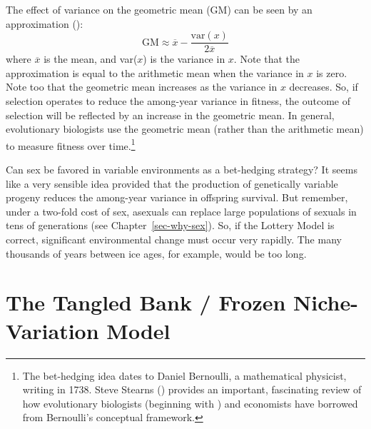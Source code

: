 \documentclass[
  american,
  letterpaper,
]{book}
\begin{document}
The effect of variance on the geometric mean (GM) can be seen by an
approximation ():\[\text{GM} \approx \overline{x} - \frac{\text{var}(x)}{2\overline{x}}\]
where \(\overline{x}\) is the mean, and var(\(x\)) is the variance in
\(x\). Note that the approximation is equal to the arithmetic mean when
the variance in \(x\) is zero. Note too that the geometric mean
increases as the variance in \(x\) decreases. So, if selection operates
to reduce the among-year variance in fitness, the outcome of selection
will be reflected by an increase in the geometric mean. In general,
evolutionary biologists use the geometric mean (rather than the
arithmetic mean) to measure fitness over time.\footnote{The bet-hedging
  idea dates to Daniel Bernoulli, a mathematical physicist, writing in
  1738. Steve Stearns () provides an
  important, fascinating review of how evolutionary biologists
  (beginning with ) and economists
  have borrowed from Bernoulli's conceptual framework.}

Can sex be favored in variable environments as a bet-hedging strategy?
It seems like a very sensible idea provided that the production of
genetically variable progeny reduces the among-year variance in
offspring survival. But remember, under a two-fold cost of sex, asexuals
can replace large populations of sexuals in tens of generations (see
Chapter~\ref{sec-why-sex}). So, if the Lottery Model is correct,
significant environmental change must occur very rapidly. The many
thousands of years between ice ages, for example, would be too long.

\section{The Tangled Bank / Frozen Niche-Variation
Model}\label{sec-niche}
\end{document}
